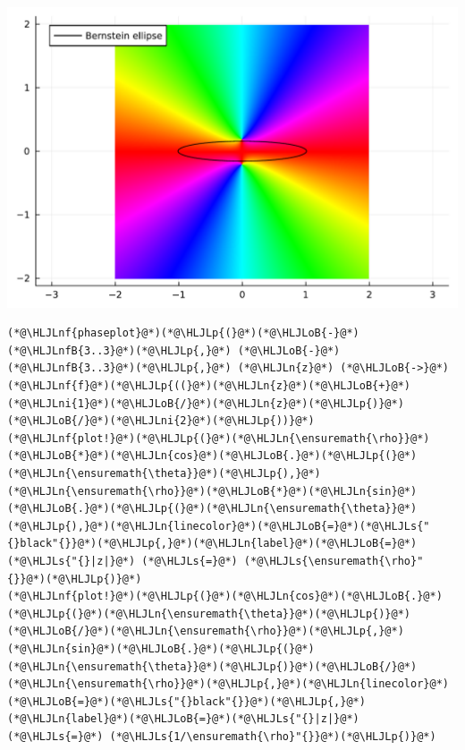\documentclass[12pt,a4paper]{article}
\newcommand{\HLJLn}[1]{#1}
\newcommand{\HLJLnf}[1]{\textcolor[RGB]{66,102,213}{#1}}
\newcommand{\HLJLs}[1]{\textcolor[RGB]{201,61,57}{#1}}
\newcommand{\HLJLnfB}[1]{\textcolor[RGB]{59,151,46}{#1}}
\newcommand{\HLJLni}[1]{\textcolor[RGB]{59,151,46}{#1}}
\newcommand{\HLJLoB}[1]{\textcolor[RGB]{102,102,102}{\textbf{#1}}}
\newcommand{\HLJLp}[1]{#1}
\begin{document}
\includegraphics[width=\linewidth]{jl_hpkPoK/OP_methods_test_26_1.pdf}

\begin{lstlisting}
(*@\HLJLnf{phaseplot}@*)(*@\HLJLp{(}@*)(*@\HLJLoB{-}@*)(*@\HLJLnfB{3..3}@*)(*@\HLJLp{,}@*) (*@\HLJLoB{-}@*)(*@\HLJLnfB{3..3}@*)(*@\HLJLp{,}@*) (*@\HLJLn{z}@*) (*@\HLJLoB{->}@*) (*@\HLJLnf{f}@*)(*@\HLJLp{((}@*)(*@\HLJLn{z}@*)(*@\HLJLoB{+}@*)(*@\HLJLni{1}@*)(*@\HLJLoB{/}@*)(*@\HLJLn{z}@*)(*@\HLJLp{)}@*)(*@\HLJLoB{/}@*)(*@\HLJLni{2}@*)(*@\HLJLp{))}@*)
(*@\HLJLnf{plot!}@*)(*@\HLJLp{(}@*)(*@\HLJLn{\ensuremath{\rho}}@*)(*@\HLJLoB{*}@*)(*@\HLJLn{cos}@*)(*@\HLJLoB{.}@*)(*@\HLJLp{(}@*)(*@\HLJLn{\ensuremath{\theta}}@*)(*@\HLJLp{),}@*)(*@\HLJLn{\ensuremath{\rho}}@*)(*@\HLJLoB{*}@*)(*@\HLJLn{sin}@*)(*@\HLJLoB{.}@*)(*@\HLJLp{(}@*)(*@\HLJLn{\ensuremath{\theta}}@*)(*@\HLJLp{),}@*)(*@\HLJLn{linecolor}@*)(*@\HLJLoB{=}@*)(*@\HLJLs{"{}black"{}}@*)(*@\HLJLp{,}@*)(*@\HLJLn{label}@*)(*@\HLJLoB{=}@*)(*@\HLJLs{"{}|z|}@*) (*@\HLJLs{=}@*) (*@\HLJLs{\ensuremath{\rho}"{}}@*)(*@\HLJLp{)}@*)
(*@\HLJLnf{plot!}@*)(*@\HLJLp{(}@*)(*@\HLJLn{cos}@*)(*@\HLJLoB{.}@*)(*@\HLJLp{(}@*)(*@\HLJLn{\ensuremath{\theta}}@*)(*@\HLJLp{)}@*)(*@\HLJLoB{/}@*)(*@\HLJLn{\ensuremath{\rho}}@*)(*@\HLJLp{,}@*)(*@\HLJLn{sin}@*)(*@\HLJLoB{.}@*)(*@\HLJLp{(}@*)(*@\HLJLn{\ensuremath{\theta}}@*)(*@\HLJLp{)}@*)(*@\HLJLoB{/}@*)(*@\HLJLn{\ensuremath{\rho}}@*)(*@\HLJLp{,}@*)(*@\HLJLn{linecolor}@*)(*@\HLJLoB{=}@*)(*@\HLJLs{"{}black"{}}@*)(*@\HLJLp{,}@*)(*@\HLJLn{label}@*)(*@\HLJLoB{=}@*)(*@\HLJLs{"{}|z|}@*) (*@\HLJLs{=}@*) (*@\HLJLs{1/\ensuremath{\rho}"{}}@*)(*@\HLJLp{)}@*)
\end{lstlisting}
\end{document}
